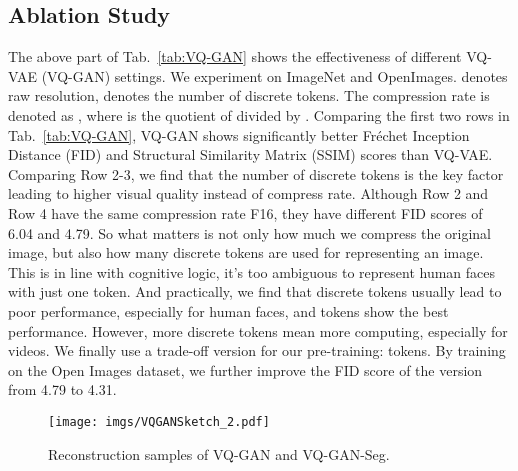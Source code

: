 \documentclass[10pt,twocolumn,letterpaper]{article}
\begin{document}
\subsection{Ablation Study}\label{sec:abl}




The above part of Tab.~\ref{tab:VQ-GAN} shows the effectiveness of different VQ-VAE (VQ-GAN) settings. We experiment on ImageNet\cite{russakovskyImageNetLargeScale2015} and OpenImages\cite{kuznetsovaOpenImagesDataset2020}.  denotes raw resolution,  denotes the number of discrete tokens. The compression rate is denoted as , where  is the quotient of  divided by . Comparing the first two rows in Tab.~\ref{tab:VQ-GAN}, VQ-GAN shows significantly better Fréchet Inception Distance (FID)\cite{heuselGansTrainedTwo2017} and Structural Similarity Matrix (SSIM) scores than VQ-VAE. Comparing Row 2-3, we find that the number of discrete tokens is the key factor leading to higher visual quality instead of compress rate. Although Row 2 and Row 4 have the same compression rate F16, they have different FID scores of 6.04 and 4.79. So what matters is not only how much we compress the original image, but also how many discrete tokens are used for representing an image. This is in line with cognitive logic, it’s too ambiguous to represent human faces with just one token. And practically, we find that  discrete tokens usually lead to poor performance, especially for human faces, and  tokens show the best performance. However, more discrete tokens mean more computing, especially for videos. We finally use a trade-off version for our pre-training:  tokens. By training on the Open Images dataset, we further improve the FID score of the  version from 4.79 to 4.31.




\begin{figure}[t]
	\centering
	\texttt{[image: imgs/VQGANSketch\_2.pdf]}
	\caption{Reconstruction samples of VQ-GAN and VQ-GAN-Seg.}
	\label{fig:VQ-GANSketch}
	\vspace{-2mm}
\end{figure}
\end{document}
